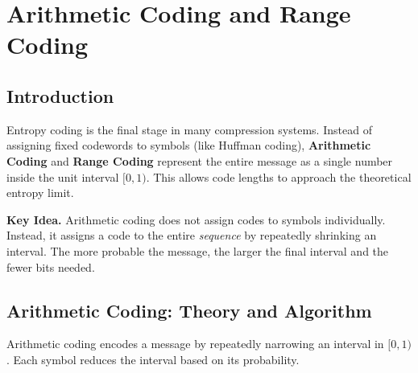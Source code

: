 
\section{Arithmetic Coding and Range Coding}

\subsection{Introduction}

Entropy coding is the final stage in many compression systems.
Instead of assigning fixed codewords to symbols (like Huffman coding),
\textbf{Arithmetic Coding} and \textbf{Range Coding} represent the entire
message as a single number inside the unit interval $[0,1)$.
This allows code lengths to approach the theoretical entropy limit.

\begin{importantbox}
\textbf{Key Idea.} Arithmetic coding does not assign codes to symbols
individually. Instead, it assigns a code to the entire \emph{sequence} by
repeatedly shrinking an interval. The more probable the message, the larger
the final interval and the fewer bits needed.
\end{importantbox}

\subsection{Arithmetic Coding: Theory and Algorithm}

Arithmetic coding encodes a message by repeatedly narrowing an interval in
$[0,1)$. Each symbol reduces the interval based on its probability.


